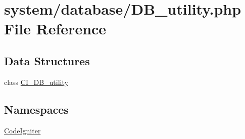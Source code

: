 \hypertarget{_d_b__utility_8php}{\section{system/database/\-D\-B\-\_\-utility.php File Reference}
\label{_d_b__utility_8php}
}
\subsection*{Data Structures}
\begin{DoxyCompactItemize}
\item 
class \hyperlink{class_c_i___d_b__utility}{C\-I\-\_\-\-D\-B\-\_\-utility}
\end{DoxyCompactItemize}
\subsection*{Namespaces}
\begin{DoxyCompactItemize}
\item 
\hyperlink{namespace_code_igniter}{Code\-Igniter}
\end{DoxyCompactItemize}
